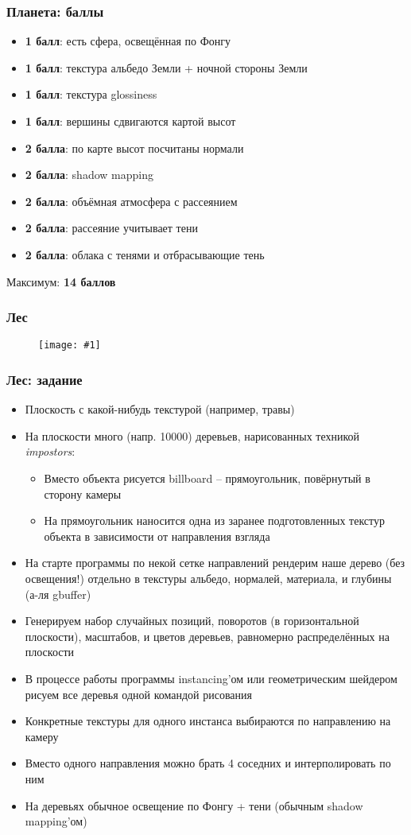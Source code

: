 \documentclass{beamer}
\newcommand{\slideimage}[1]{
  \begin{figure}
    \begin{adjustbox}{width=\textwidth, totalheight=\textheight-2\baselineskip-2\baselineskip,keepaspectratio}
      \texttt{[image: \#1]}
    \end{adjustbox}
  \end{figure}
}
\begin{document}
\begin{frame}[fragile]
\frametitle{Планета: баллы}
\fontsize{8pt}{8pt}
\selectfont
\begin{itemize}
\item \textbf{1 балл}: есть сфера, освещённая по Фонгу
\item \textbf{1 балл}: текстура альбедо Земли + ночной стороны Земли
\item \textbf{1 балл}: текстура glossiness
\item \textbf{1 балл}: вершины сдвигаются картой высот
\item \textbf{2 балла}: по карте высот посчитаны нормали
\item \textbf{2 балла}: shadow mapping
\item \textbf{2 балла}: объёмная атмосфера с рассеянием
\item \textbf{2 балла}: рассеяние учитывает тени
\item \textbf{2 балла}: облака с тенями и отбрасывающие тень
\end{itemize}
Максимум: \textbf{14 баллов}
\end{frame}

\begin{frame}
\frametitle{Лес}
\slideimage{impostors-forest.jpg}
\end{frame}

\begin{frame}[fragile]
\frametitle{Лес: задание}
\fontsize{8pt}{8pt}
\selectfont
\begin{itemize}
\item Плоскость с какой-нибудь текстурой (например, травы)
\item На плоскости много (напр. 10000) деревьев, нарисованных техникой \textit{impostors}:
\begin{itemize}
\fontsize{8pt}{8pt}
\selectfont
\item Вместо объекта рисуется billboard -- прямоугольник, повёрнутый в сторону камеры
\item На прямоугольник наносится одна из заранее подготовленных текстур объекта в зависимости от направления взгляда
\end{itemize}
\item На старте программы по некой сетке направлений рендерим наше дерево (без освещения!) отдельно в текстуры альбедо, нормалей, материала, и глубины (а-ля gbuffer)
\item Генерируем набор случайных позиций, поворотов (в горизонтальной плоскости), масштабов, и цветов деревьев, равномерно распределённых на плоскости
\item В процессе работы программы instancing'ом или геометрическим шейдером рисуем все деревья одной командой рисования
\item Конкретные текстуры для одного инстанса выбираются по направлению на камеру
\item Вместо одного направления можно брать 4 соседних и интерполировать по ним
\item На деревьях обычное освещение по Фонгу + тени (обычным shadow mapping'ом)
\end{itemize}
\end{frame}
\end{document}
